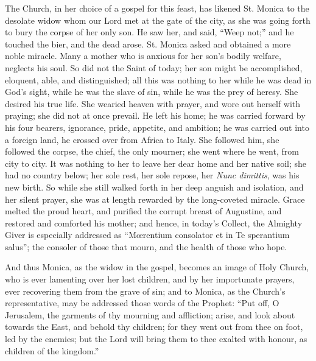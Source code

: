 The Church, in her choice of a gospel for this feast,
has likened St. Monica to the desolate widow whom our
Lord met at the gate of the city, as she was going forth
to bury the corpse of her only son. He saw her, and said,
``Weep not;'' and he touched the bier, and the
dead arose. St. Monica asked and obtained a more noble
miracle. Many a mother who is anxious for her son's
bodily welfare, neglects his soul. So did not the Saint
of today; her son might be accomplished, eloquent, able,
and distinguished; all this was nothing to her while he
was dead in God's sight, while he was the slave of sin,
while he was the prey of heresy. She desired his true
life. She wearied heaven with prayer, and wore out
herself with praying; she did not at once prevail. He
left his home; he was carried forward by his four
bearers, ignorance, pride, appetite, and ambition; he was
carried out into a foreign land, he crossed over from
Africa to Italy. She followed him, she followed the
corpse, the chief, the only mourner; she went where he
went, from city to city. It was nothing to her to leave
her dear home and her native soil; she had no country
below; her sole rest, her sole repose, her \emph{Nunc
dimittis}, was his new birth. So while she still
walked forth in her deep anguish and isolation, and her
silent prayer, she was at length rewarded by the
long-coveted miracle. Grace melted the proud heart, and
purified the corrupt breast of Augustine, and restored
and comforted his mother; and hence, in today's Collect,
the Almighty Giver is especially addressed as
``Mœrentium consolator et in Te sperantium
salus''; the consoler of those that mourn, and the
health of those who hope.

And thus Monica, as the widow in the gospel, becomes
an image of Holy Church, who is ever lamenting over her
lost children, and by her importunate prayers, ever
recovering them from the grave of sin; and to Monica, as
the Church's representative, may be addressed those words
of the Prophet: ``Put off, O Jerusalem, the garments
of thy mourning and affliction; arise, and look about
towards the East, and behold thy children; for they went
out from thee on foot, led by the enemies; but the Lord
will bring them to thee exalted with honour, as children
of the kingdom.''

